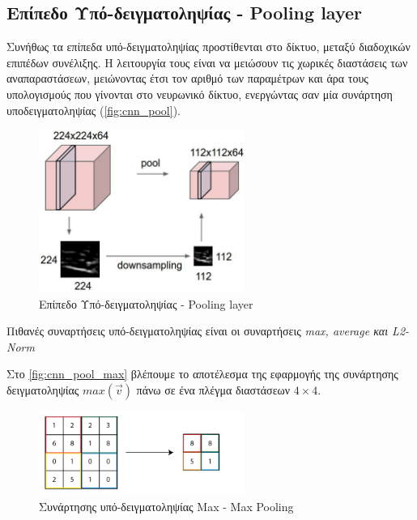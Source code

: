 \subsection{Επίπεδο Υπό-δειγματοληψίας - Pooling layer}

Συνήθως τα επίπεδα υπό-δειγματοληψίας προστίθενται στο δίκτυο, μεταξύ διαδοχικών
επιπέδων συνέλιξης. Η λειτουργία τους είναι να μειώσουν τις χωρικές
διαστάσεις των αναπαραστάσεων, μειώνοντας έτσι τον αριθμό των
παραμέτρων και άρα τους υπολογισμούς που γίνονται στο νευρωνικό δίκτυο, ενεργώντας σαν
μία συνάρτηση υποδειγματοληψίας
(\autoref{fig:cnn_pool}).

\begin{figure}[!ht]
  \centering
  \includegraphics[width=0.6\textwidth]{./images/chapter3/cnn_pool.jpg}
  \caption[Επίπεδο Υποδειγματοληψίας - Pooling layer]{Επίπεδο Υπό-δειγματοληψίας - Pooling layer}
  \label{fig:cnn_pool}
\end{figure}
Πιθανές συναρτήσεις υπό-δειγματοληψίας είναι οι συναρτήσεις \emph{max, average και L2-Norm}

Στο \autoref{fig:cnn_pool_max} βλέπουμε το αποτέλεσμα της εφαρμογής της συνάρτησης
δειγματοληψίας $max(\vec{v})$ πάνω σε ένα πλέγμα διαστάσεων $4 \times 4$.

\begin{figure}[!ht]
  \centering
  \includegraphics[width=0.6\textwidth]{./images/chapter3/cnn_pool_max.png}
  \caption[Συνάρτηση υπό-δειγματοληψίας Max - Max Pooling]{Συνάρτησης υπό-δειγματοληψίας Max - Max Pooling}
  \label{fig:cnn_pool_max}
\end{figure}


